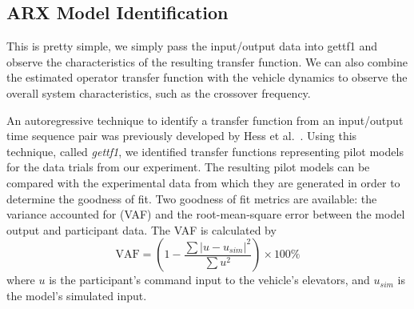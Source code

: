 \subsection{ARX Model Identification}
This is pretty simple, we simply pass the input/output data into gettf1 and observe the characteristics of the resulting transfer function.
We can also combine the estimated operator transfer function with the vehicle dynamics to observe the overall system characteristics, such as the crossover frequency.

An autoregressive technique to identify a transfer function from an input/output time sequence pair was previously developed by Hess et al.~\cite{hess_modeling_2002}.
Using this technique, called \textit{gettf1}, we identified transfer functions representing pilot models for the data trials from our experiment.
The resulting pilot models can be compared with the experimental data from which they are generated in order to determine the goodness of fit.
Two goodness of fit metrics are available: the variance accounted for (VAF) and the root-mean-square error between the model output and participant data.
The VAF is calculated by
\begin{equation}
    \mbox{VAF} = \left( 1 - \dfrac{\sum{|u - u_{sim}|^2}} {\sum{u^2}} \right) \times \mbox{100\%}
\end{equation}
where $u$ is the participant's command input to the vehicle's elevators, and $u_{sim}$ is the model's simulated input.


